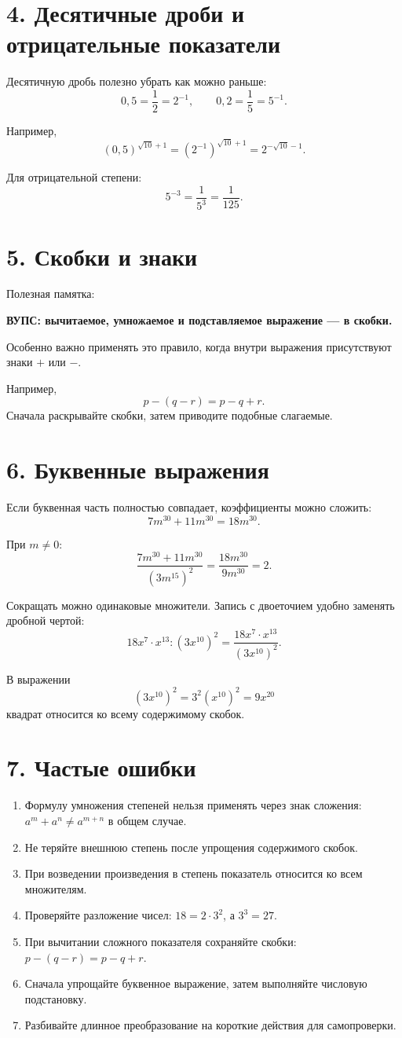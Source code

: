 \documentclass[a4paper,12pt]{article}
\newcommand{\important}[1]{\textcolor{darkaccent}{\textbf{#1}}}
\begin{document}
\section*{4. Десятичные дроби и отрицательные показатели}
Десятичную дробь полезно убрать как можно раньше:
\[
0{,}5=\frac12=2^{-1},\qquad 0{,}2=\frac15=5^{-1}.
\]

Например,
\[
(0{,}5)^{\sqrt{10}+1}
=(2^{-1})^{\sqrt{10}+1}
=2^{-\sqrt{10}-1}.
\]

Для отрицательной степени:
\[
5^{-3}=\frac1{5^3}=\frac1{125}.
\]

\section*{5. Скобки и знаки}
Полезная памятка:
\begin{center}
\important{ВУПС: вычитаемое, умножаемое и подставляемое выражение --- в скобки.}
\end{center}
Особенно важно применять это правило, когда внутри выражения присутствуют знаки \(+\) или \(-\).

Например,
\[
p-(q-r)=p-q+r.
\]
Сначала раскрывайте скобки, затем приводите подобные слагаемые.

\section*{6. Буквенные выражения}
Если буквенная часть полностью совпадает, коэффициенты можно сложить:
\[
7m^{30}+11m^{30}=18m^{30}.
\]

При \(m\ne0\):
\[
\frac{7m^{30}+11m^{30}}{(3m^{15})^2}
=\frac{18m^{30}}{9m^{30}}=2.
\]

Сокращать можно одинаковые множители. Запись с двоеточием удобно заменять дробной чертой:
\[
18x^7\cdot x^{13}:(3x^{10})^2
=\frac{18x^7\cdot x^{13}}{(3x^{10})^2}.
\]

В выражении
\[
(3x^{10})^2=3^2(x^{10})^2=9x^{20}
\]
квадрат относится ко всему содержимому скобок.

\section*{7. Частые ошибки}
\begin{enumerate}[label=\textbf{\arabic*)}]
\item Формулу умножения степеней нельзя применять через знак сложения: \(a^m+a^n\ne a^{m+n}\) в общем случае.
\item Не теряйте внешнюю степень после упрощения содержимого скобок.
\item При возведении произведения в степень показатель относится ко всем множителям.
\item Проверяйте разложение чисел: \(18=2\cdot3^2\), а \(3^3=27\).
\item При вычитании сложного показателя сохраняйте скобки: \(p-(q-r)=p-q+r\).
\item Сначала упрощайте буквенное выражение, затем выполняйте числовую подстановку.
\item Разбивайте длинное преобразование на короткие действия для самопроверки.
\end{enumerate}
\end{document}
